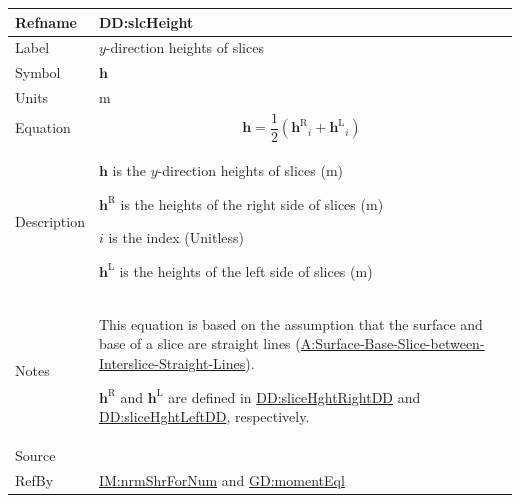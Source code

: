 \documentclass[12pt]{article}
\begin{document}
\medskip
\noindent
\begin{minipage}{\textwidth}
\begin{tabular}{>{\raggedright}p{}>{\raggedright\arraybackslash}p{}}
\toprule \textbf{Refname} & \textbf{DD:slcHeight}
\label{DD:slcHeight}
\\ \midrule
Label & $y$-direction heights of slices
        
\\ \midrule
Symbol & $\symbf{h}$
         
\\ \midrule
Units & ${\text{m}}$
        
\\ \midrule
Equation & \begin{displaymath}
           \symbf{h}=\frac{1}{2} \left({{\symbf{h}^{\text{R}}}}_{i}+{{\symbf{h}^{\text{L}}}}_{i}\right)
           \end{displaymath}
\\ \midrule
Description & \begin{symbDescription}
              \item{$\symbf{h}$ is the $y$-direction heights of slices (${\text{m}}$)}
              \item{${\symbf{h}^{\text{R}}}$ is the heights of the right side of slices (${\text{m}}$)}
              \item{$i$ is the index (Unitless)}
              \item{${\symbf{h}^{\text{L}}}$ is the heights of the left side of slices (${\text{m}}$)}
              \end{symbDescription}
\\ \midrule
Notes & This equation is based on the assumption that the surface and base of a slice are straight lines (\hyperref[assumpSBSBISL]{A:Surface-Base-Slice-between-Interslice-Straight-Lines}).
        
        ${\symbf{h}^{\text{R}}}$ and ${\symbf{h}^{\text{L}}}$ are defined in \hyperref[DD:sliceHghtRightDD]{DD:sliceHghtRightDD} and \hyperref[DD:sliceHghtLeftDD]{DD:sliceHghtLeftDD}, respectively.
        
\\ \midrule
Source & \cite{fredlund1977}
         
\\ \midrule
RefBy & \hyperref[IM:nrmShrForNum]{IM:nrmShrForNum} and \hyperref[GD:momentEql]{GD:momentEql}
        
\\ \bottomrule
\end{tabular}
\end{minipage}
\end{document}
